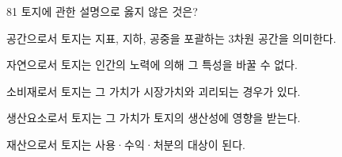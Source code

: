 \begin{question}{81}
토지에 관한 설명으로 옳지 않은 것은?
\begin{choices}
  \item 공간으로서 토지는 지표, 지하, 공중을 포괄하는 3차원 공간을 의미한다.
  \item 자연으로서 토지는 인간의 노력에 의해 그 특성을 바꿀 수 없다.
  \item 소비재로서 토지는 그 가치가 시장가치와 괴리되는 경우가 있다.
  \item 생산요소로서 토지는 그 가치가 토지의 생산성에 영향을 받는다.
  \item 재산으로서 토지는 사용·수익·처분의 대상이 된다.
\end{choices}
\end{question}
